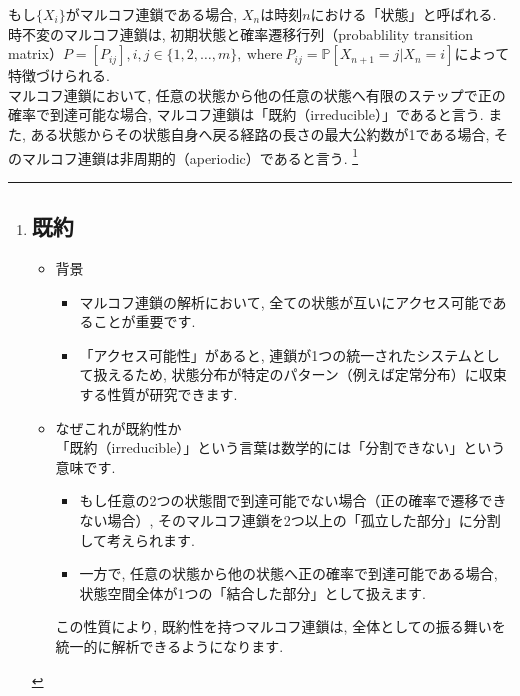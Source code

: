 \documentclass[a4j]{jsarticle}
\begin{document}
もし$\{X_i\}$がマルコフ連鎖である場合, $X_n$は時刻$n$における「状態」と呼ばれる. 時不変のマルコフ連鎖は, 初期状態と確率遷移行列（probablility transition matrix）$P = [P_{ij}], i,j \in \{1, 2, \ldots, m\}, \: \mbox{where} \: P_{ij} = \mathbb{P}[X_{n+1} = j | X_n = i]$によって特徴づけられる.\\

 マルコフ連鎖において, 任意の状態から他の任意の状態へ有限のステップで正の確率で到達可能な場合, マルコフ連鎖は「既約（irreducible）」であると言う. また, ある状態からその状態自身へ戻る経路の長さの最大公約数が1である場合, そのマルコフ連鎖は非周期的（aperiodic）であると言う.
\footnote{
	\subsection*{既約}
	\begin{itemize}
		\item 背景
		      \begin{itemize}
			      \item マルコフ連鎖の解析において, 全ての状態が互いにアクセス可能であることが重要です.
			            \item「アクセス可能性」があると, 連鎖が1つの統一されたシステムとして扱えるため, 状態分布が特定のパターン（例えば定常分布）に収束する性質が研究できます.
		      \end{itemize}
		\item なぜこれが既約性か\\
		      「既約（irreducible）」という言葉は数学的には「分割できない」という意味です.
		      \begin{itemize}
			      \item もし任意の2つの状態間で到達可能でない場合（正の確率で遷移できない場合）, そのマルコフ連鎖を2つ以上の「孤立した部分」に分割して考えられます.
			      \item 一方で, 任意の状態から他の状態へ正の確率で到達可能である場合, 状態空間全体が1つの「結合した部分」として扱えます.
		      \end{itemize}
		      この性質により, 既約性を持つマルコフ連鎖は, 全体としての振る舞いを統一的に解析できるようになります.
	\end{itemize}
}
\end{document}
